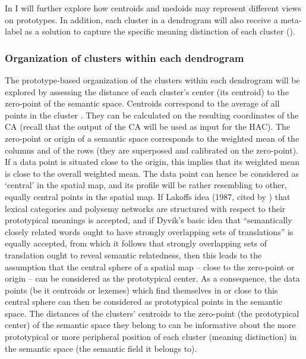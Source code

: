 In  I will further explore how centroids and medoids may represent different views on prototypes. In addition, each cluster in a dendrogram will also receive a meta-label as a solution to capture the specific meaning distinction of each cluster ().

\subsubsection{Organization of clusters within each dendrogram}
\label{sec:3.8.1.1}  
The prototype-based organization of the clusters within each dendrogram will be explored by assessing the distance of each cluster’s center (its centroid) to the zero-point of the semantic space. Centroids correspond to the average of all points in the cluster \citep[494]{tan_introduction_2006}. They can be calculated on the resulting coordinates of the CA (recall that the output of the CA will be used as input for the HAC). The zero-point or origin of a semantic space corresponds to the weighted mean of the columns and of the rows (they are superposed and calibrated on the zero-point). If a data point is situated close to the origin, this implies that its weighted mean is close to the overall weighted mean. The data point can hence be considered as ‘central’ in the spatial map, and its profile will be rather resembling to other, equally central points in the spatial map. If Lakoffs idea (1987, cited by \citealt{tyler_semantics_2003}) that lexical categories and polysemy networks are structured with respect to their prototypical meanings is accepted, and if Dyvik’s basic idea that “semantically closely related words ought to have strongly overlapping sets of translations” is equally accepted, from which it follows that strongly overlapping sets of translation ought to reveal semantic relatedness, then this leads to the assumption that the central sphere of a spatial map – close to the zero-point or origin – can be considered as the prototypical center. As a consequence, the data points (be it centroids or lexemes) which find themselves in or close to this central sphere can then be considered as prototypical points in the semantic space. The distances of the clusters’ centroids to the zero-point (the prototypical center) of the semantic space they belong to can be informative about the more prototypical or more peripheral position of each cluster (meaning distinction) in the semantic space (the semantic field it belongs to).

